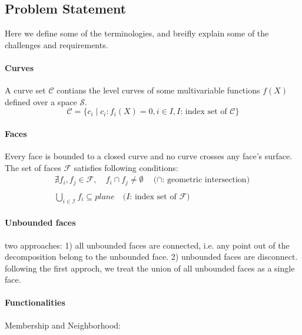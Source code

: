 \subsection{Problem Statement}

Here we define some of the terminologies, and breifly explain some of the challenges and requirements.

\paragraph{Curves}
A curve set $\mathcal{C}$ contians the level curves of some multivariable functions $f(X)$ defined over a space $\mathcal{S}$.
\[
\mathcal{C} = \lbrace c_i \mid c_i: f_i(X)=0, i \in I, \text{$I$: index set of $\mathcal{C}$} \rbrace
\]

\paragraph{Faces}
Every face is bounded to a closed curve and no curve crosses any face's surface.
The set of faces $\mathcal{F}$ satisfies following conditions:
\[
\begin{array}{l}
  \nexists f_i , f_j \in \mathcal{F}, \quad f_i \cap f_j \neq \emptyset \quad \text{($\cap$: geometric intersection)}\\
  \quad \\
  \displaystyle\bigcup_{ i \in \mathcal{I} } f_i \subseteq plane \quad \text{($I$: index set of $\mathcal{F}$)}
\end{array}
\]

\paragraph{Unbounded faces}
two approaches:
1) all unbounded faces are connected, i.e. any point out of the decomposition belong to the unbounded face.
2) unbounded faces are disconnect.
following the first approch, we treat the union of all unbounded faces as a single face.

\paragraph{Functionalities}
Membership and Neighborhood:

